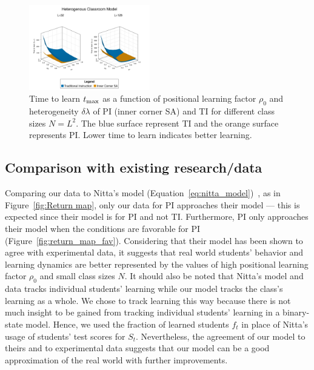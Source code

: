 \documentclass[twocolumn,secnumarabic,amssymb, nobibnotes, aps, prd]{revtex4-2}
\begin{document}
        \begin{figure}[htbp!]
            \centering
            \includegraphics[width=0.47\textwidth]{figures/2D-BPCAIH-analysis/rho-dl-t plots/32-128 comparison.png}
            \caption{Time to learn $t_{\rm max}$ as a function of positional learning factor $\rho_0$ and heterogeneity $\delta\lambda$ of PI (inner corner SA) and TI for different class sizes $N=L^2$.
            The blue surface represent TI and the orange surface represents PI.
            Lower time to learn indicates better learning.}
            \label{fig:Params effect summary t}
        \end{figure}

    \subsection{Comparison with existing research/data}
        
        Comparing our data to Nitta's model (Equation~\ref{eq:nitta_model})~\cite{nitta2019mathematical}, as in Figure~\ref{fig:Return map}, only our data for PI approaches their model --- this is expected since their model is for PI and not TI.
        Furthermore, PI only approaches their model when the conditions are favorable for PI (Figure~\ref{fig:return_map_fav}).
        Considering that their model has been shown to agree with experimental data, it suggests that real world students' behavior and learning dynamics are better represented by the values of high positional learning factor $\rho_0$ and small class sizes $N$.
        It should also be noted that Nitta's model and data tracks individual students' learning while our model tracks the class's learning as a whole.
        We chose to track learning this way because there is not much insight to be gained from tracking individual students' learning in a binary-state model.
        Hence, we used the fraction of learned students $f_t$ in place of Nitta's usage of students' test scores for $S_t$.
        Nevertheless, the agreement of our model to theirs and to experimental data suggests that our model can be a good approximation of the real world with further improvements.
\end{document}
